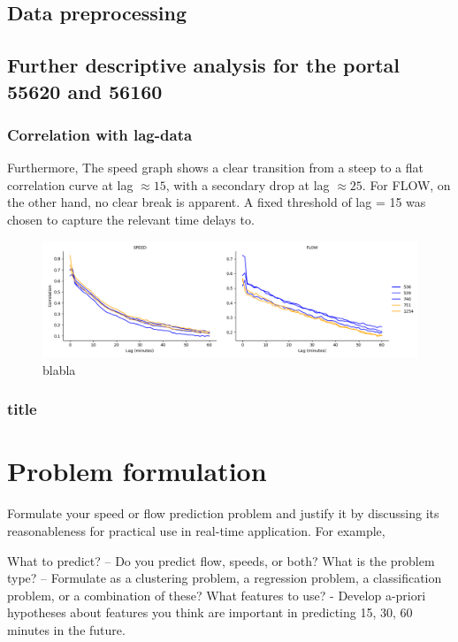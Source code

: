 	
	\subsection{Data preprocessing}
	\subsection{Further descriptive analysis for the portal 55620 and 56160}
	\subsubsection{Correlation with lag-data}
	Furthermore, 
	The speed graph shows a clear transition from a steep to a flat correlation curve at lag $\approx  15$, with a secondary drop at lag $\approx 25$.
	For FLOW, on the other hand, no clear break is apparent.
	A fixed threshold of lag = 15 was chosen to capture the relevant time delays to.
	\begin{figure}[H]
		\centering
		\includegraphics[width =0.99 \linewidth]{../Plots/Correlation_lag_flow_speed_peak}
		\caption{blabla}
		\label{fig:correlation_lag}
	\end{figure}

	\subsubsection{title}
	\section{Problem formulation}
	
	Formulate your speed or flow prediction problem and justify it by discussing its reasonableness for practical use in real-time application. For example,   
	
	What to predict? – Do you predict flow, speeds, or both?
	What is the problem type? – Formulate as a clustering problem, a regression problem, a classification problem, or a combination of these? 
	What features to use? - Develop a-priori hypotheses about features you think are important in predicting 15, 30, 60 minutes in the future. 
	
